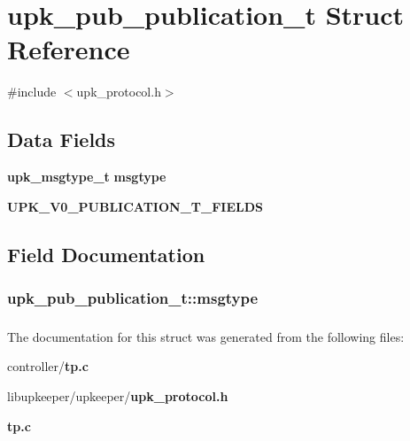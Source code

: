 \section{upk\_\-pub\_\-publication\_\-t Struct Reference}
\label{structupk__pub__publication__t}


{\ttfamily \#include $<$upk\_\-protocol.h$>$}

\subsection*{Data Fields}
\begin{DoxyCompactItemize}
\item 
{\bf upk\_\-msgtype\_\-t} {\bf msgtype}
\item 
{\bf UPK\_\-V0\_\-PUBLICATION\_\-T\_\-FIELDS}
\end{DoxyCompactItemize}


\subsection{Field Documentation}
\subsubsection[{msgtype}]{ {\bf upk\_\-pub\_\-publication\_\-t::msgtype}}\label{structupk__pub__publication__t_a6c48c00243962a89925cf7c8f466be27}
\subsubsection[{UPK\_\-V0\_\-PUBLICATION\_\-T\_\-FIELDS}]{}\label{structupk__pub__publication__t_ae9bc317f7b9728751b7f71e84c9ee9cc}


The documentation for this struct was generated from the following files:\begin{DoxyCompactItemize}
\item 
controller/{\bf tp.c}\item 
libupkeeper/upkeeper/{\bf upk\_\-protocol.h}\item 
{\bf tp.c}\end{DoxyCompactItemize}
